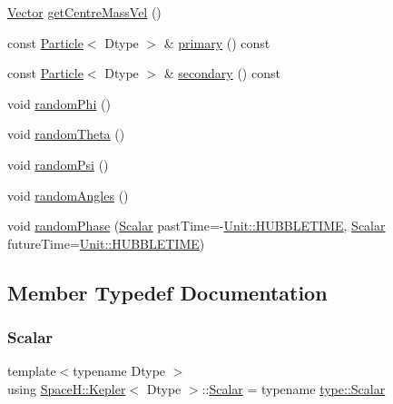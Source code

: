 \begin{DoxyCompactItemize}
\item 
\mbox{\hyperlink{struct_space_h_1_1_kepler_aa0f5e7ecefa626a0e32a9435dd9662cd}{Vector}} \mbox{\hyperlink{struct_space_h_1_1_kepler_ab3c523b35f5d0c4f25fdf3bf46830c08}{get\+Centre\+Mass\+Vel}} ()
\item 
const \mbox{\hyperlink{struct_space_h_1_1_particle}{Particle}}$<$ Dtype $>$ \& \mbox{\hyperlink{struct_space_h_1_1_kepler_a4eec4730b416c39c431ec3251e869aaa}{primary}} () const
\item 
const \mbox{\hyperlink{struct_space_h_1_1_particle}{Particle}}$<$ Dtype $>$ \& \mbox{\hyperlink{struct_space_h_1_1_kepler_a40fb68cda1662a2ae76e541e2c8fadb8}{secondary}} () const
\item 
void \mbox{\hyperlink{struct_space_h_1_1_kepler_ae8a58ee2c7658d9a1aec71ff8a8e271f}{random\+Phi}} ()
\item 
void \mbox{\hyperlink{struct_space_h_1_1_kepler_a8d8e745f0a2773e1e3469f25ca6cac76}{random\+Theta}} ()
\item 
void \mbox{\hyperlink{struct_space_h_1_1_kepler_a162d47c07b7dbcd361dae5725b718760}{random\+Psi}} ()
\item 
void \mbox{\hyperlink{struct_space_h_1_1_kepler_ac8d49ec22dd42341e73a289a818ae0ac}{random\+Angles}} ()
\item 
void \mbox{\hyperlink{struct_space_h_1_1_kepler_a7a21a6bad2fda19e9d93e023c8879c42}{random\+Phase}} (\mbox{\hyperlink{struct_space_h_1_1_kepler_a19291f268209f594a96fb4828fa1a54c}{Scalar}} past\+Time=-\/\mbox{\hyperlink{namespace_space_h_1_1_unit_af26bad8094a2c37c5b9932d9c40baaac}{Unit\+::\+H\+U\+B\+B\+L\+E\+T\+I\+ME}}, \mbox{\hyperlink{struct_space_h_1_1_kepler_a19291f268209f594a96fb4828fa1a54c}{Scalar}} future\+Time=\mbox{\hyperlink{namespace_space_h_1_1_unit_af26bad8094a2c37c5b9932d9c40baaac}{Unit\+::\+H\+U\+B\+B\+L\+E\+T\+I\+ME}})
\end{DoxyCompactItemize}


\subsection{Member Typedef Documentation}
\mbox{\label{struct_space_h_1_1_kepler_a19291f268209f594a96fb4828fa1a54c}} 
\subsubsection{\texorpdfstring{Scalar}{Scalar}}
{\footnotesize\ttfamily template$<$typename Dtype $>$ \\
using \mbox{\hyperlink{struct_space_h_1_1_kepler}{Space\+H\+::\+Kepler}}$<$ Dtype $>$\+::\mbox{\hyperlink{struct_space_h_1_1_kepler_a19291f268209f594a96fb4828fa1a54c}{Scalar}} =  typename \mbox{\hyperlink{struct_space_h_1_1_proto_type_af3c8245d83d9db64749882920de5c274}{type\+::\+Scalar}}}

